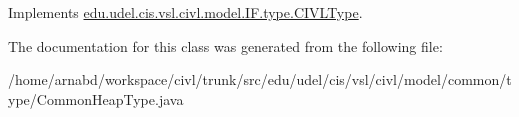 Implements \hyperlink{interfaceedu_1_1udel_1_1cis_1_1vsl_1_1civl_1_1model_1_1IF_1_1type_1_1CIVLType_adfbc8da7beab0f682ed6d4e02b68b9d8}{edu.\+udel.\+cis.\+vsl.\+civl.\+model.\+I\+F.\+type.\+C\+I\+V\+L\+Type}.



The documentation for this class was generated from the following file\+:\begin{DoxyCompactItemize}
\item 
/home/arnabd/workspace/civl/trunk/src/edu/udel/cis/vsl/civl/model/common/type/Common\+Heap\+Type.\+java\end{DoxyCompactItemize}
